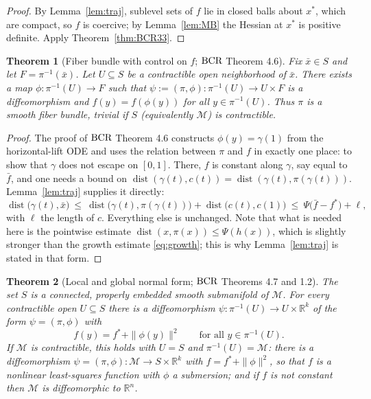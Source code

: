 \documentclass[11pt]{article}
\theoremstyle{plain}
\newtheorem{thm}{Theorem}[section]
\theoremstyle{definition}
\theoremstyle{remark}
\newcommand{\M}{\mathcal{M}}
\newcommand{\R}{\mathbb{R}}
\DeclareMathOperator{\dist}{dist}
\newcommand{\bcr}{\textup{BCR}}
\begin{document}
\begin{proof}
By Lemma~\ref{lem:traj}, sublevel sets of $f$ lie in closed balls about $x^*$,
which are compact, so $f$ is coercive; by Lemma~\ref{lem:MB} the Hessian at
$x^*$ is positive definite. Apply Theorem~\ref{thm:BCR33}.
\end{proof}

\begin{thm}[Fiber bundle with control on $f$; $\bcr$ Theorem 4.6]\label{thm:bundle}
Fix $\bar x\in S$ and let $F=\pi^{-1}(\bar x)$. Let $U\subseteq S$ be a
contractible open neighborhood of $\bar x$. There exists a map
$\phi\colon\pi^{-1}(U)\to F$ such that
$\psi := (\pi,\phi)\colon\pi^{-1}(U)\to U\times F$ is a diffeomorphism and
$f(y) = f(\phi(y))$ for all $y\in\pi^{-1}(U)$. Thus $\pi$ is a smooth fiber
bundle, trivial if $S$ (equivalently $\M$) is contractible.
\end{thm}

\begin{proof}
The proof of $\bcr$ Theorem 4.6 constructs $\phi(y)=\gamma(1)$ from the
horizontal-lift ODE and uses the relation between $\pi$ and $f$ in exactly one
place: to show that $\gamma$ does not escape on $[0,1]$. There, $f$ is constant
along $\gamma$, say equal to $\bar f$, and one needs a bound on
$\dist(\gamma(t), c(t)) = \dist(\gamma(t), \pi(\gamma(t)))$. Lemma~\ref{lem:traj}
supplies it directly:
\[
  \dist\bigl(\gamma(t),\bar x\bigr)
  \ \le\ \dist\bigl(\gamma(t),\pi(\gamma(t))\bigr) + \dist\bigl(c(t),c(1)\bigr)
  \ \le\ \Psi\bigl(\bar f - f^*\bigr) + \ell ,
\]
with $\ell$ the length of $c$. Everything else is unchanged. Note that what is
needed here is the pointwise estimate $\dist(x,\pi(x)) \le \Psi(h(x))$, which is
slightly stronger than the growth estimate \eqref{eq:growth}; this is why
Lemma~\ref{lem:traj} is stated in that form.
\end{proof}

\begin{thm}[Local and global normal form; $\bcr$ Theorems 4.7 and 1.2]\label{thm:main}
The set $S$ is a connected, properly embedded smooth submanifold of $\M$. For
every contractible open $U\subseteq S$ there is a diffeomorphism
$\psi\colon\pi^{-1}(U)\to U\times\R^k$ of the form $\psi=(\pi,\phi)$ with
\[
  f(y) = f^* + \|\phi(y)\|^2 \qquad \text{for all } y\in\pi^{-1}(U) .
\]
If $\M$ is contractible, this holds with $U=S$ and $\pi^{-1}(U)=\M$: there is a
diffeomorphism $\psi=(\pi,\phi)\colon\M\to S\times\R^k$ with
$f = f^* + \|\phi\|^2$, so that $f$ is a nonlinear least-squares function with
$\phi$ a submersion; and if $f$ is not constant then $\M$ is diffeomorphic to
$\R^n$.
\end{thm}
\end{document}
